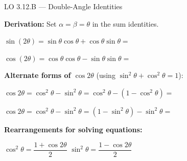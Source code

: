 \documentclass[10pt]{article}
\begin{document}
\vspace{0.08in}

\begin{notesbox}{LO 3.12.B --- Double-Angle Identities}

\textbf{Derivation:} Set $\alpha = \beta = \theta$ in the sum identities.

\vspace{4pt}
$\sin(2\theta) = \sin\theta\cos\theta + \cos\theta\sin\theta
= $ \underline{\hspace{3.5cm}}

\vspace{6pt}
$\cos(2\theta) = \cos\theta\cos\theta - \sin\theta\sin\theta
= $ \underline{\hspace{3.5cm}}

\vspace{8pt}
\textbf{Alternate forms of $\cos 2\theta$} (using $\sin^2\theta + \cos^2\theta = 1$):

\vspace{4pt}
$\cos 2\theta = \cos^2\theta - \sin^2\theta
= \cos^2\theta - (1 - \cos^2\theta) = $ \underline{\hspace{3.5cm}}

\vspace{4pt}
$\cos 2\theta = \cos^2\theta - \sin^2\theta
= (1 - \sin^2\theta) - \sin^2\theta = $ \underline{\hspace{3.5cm}}

\vspace{8pt}
\textbf{Rearrangements for solving equations:}

\vspace{4pt}
$\cos^2\theta = \dfrac{1 + \cos 2\theta}{2}$
\hspace{1.4cm}
$\sin^2\theta = \dfrac{1 - \cos 2\theta}{2}$

\end{notesbox}

\vspace{0.08in}
\end{document}
